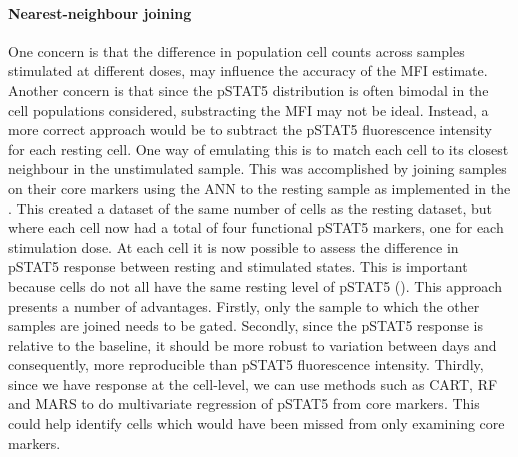 \paragraph{Nearest-neighbour joining}
One concern is that the difference in population cell counts across samples stimulated at different doses, may influence the accuracy of the MFI estimate.
Another concern is that since the pSTAT5 distribution is often bimodal in the cell populations considered, substracting the MFI may not be ideal.
Instead, a more correct approach would be to subtract the pSTAT5 fluorescence intensity for each resting cell.
One way of emulating this is to match each cell to its closest neighbour in the unstimulated sample.  
This was accomplished by joining samples on their core markers using the \gls{ANN} to the resting sample \citep{Jones:2011ez}
as implemented in the .
This created a dataset of the same number of cells as the resting dataset, but where each cell now had a total of four functional pSTAT5 markers,
one for each stimulation dose.
At each cell it is now possible to assess the difference in pSTAT5 response between resting and stimulated states.
This is important because cells do not all have the same resting level of pSTAT5 ().
This approach presents a number of advantages.
Firstly, only the sample to which the other samples are joined needs to be gated.
Secondly, since the pSTAT5 response is relative to the baseline, it should be more robust to variation between days
and consequently, more reproducible than pSTAT5 fluorescence intensity.
Thirdly, since we have response at the cell-level, we can use methods
such as \gls{CART}, \gls{RF} and \gls{MARS} to do multivariate regression of pSTAT5 from core markers.
This could help identify cells which would have been missed from only examining core markers.

